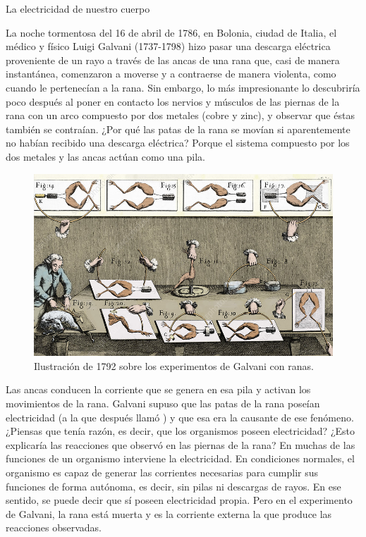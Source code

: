 \begin{sectionbox}{La electricidad de nuestro cuerpo}
    \begin{minipage}{0.35\textwidth}
        La noche tormentosa del 16 de abril de 1786, en Bolonia, ciudad de Italia, el médico y físico
        Luigi Galvani (1737-1798) hizo pasar una descarga eléctrica proveniente de un rayo a través de las ancas de una rana que, casi
        de manera instantánea, comenzaron a moverse y a contraerse
        de manera violenta, como cuando le pertenecían a la rana.
        Sin embargo, lo más impresionante lo descubriría poco después al poner en contacto los nervios y músculos de las piernas
        de la rana con un arco compuesto por dos metales (cobre y zinc),
        y observar que éstas también se contraían. ¿Por qué las patas de la rana se movían si aparentemente no
        habían recibido una descarga eléctrica? Porque el sistema compuesto por los dos metales y las ancas actúan como una
        pila.
    \end{minipage}\hfill
    \begin{minipage}{0.6\textwidth}
        \begin{figure}[H]
            \centering
            \includegraphics[width=0.95\linewidth]{../images/galvani01}
            \caption{Ilustración de 1792 sobre los experimentos de Galvani con ranas.}
            \label{fig:galvani01}
        \end{figure}
    \end{minipage}

    Las ancas conducen la corriente que se genera en esa pila y activan los
    movimientos de la rana. Galvani supuso que las patas de la rana poseían electricidad
    (a la que después llamó ) y que esa era
    la causante de ese fenómeno. ¿Piensas que tenía razón, es
    decir, que los organismos poseen electricidad? ¿Esto explicaría las reacciones que observó en las piernas de la rana?
    En muchas de las funciones de un organismo interviene la electricidad. En condiciones normales, el organismo es capaz de generar las corrientes necesarias
    para cumplir sus funciones de forma autónoma, es decir, sin pilas ni descargas de
    rayos. En ese sentido, se puede decir que sí poseen electricidad propia. Pero en
    el experimento de Galvani, la rana está muerta y es la corriente externa la que
    produce las reacciones observadas.


\end{sectionbox}
